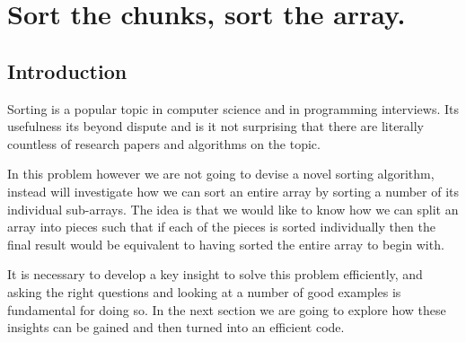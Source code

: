 %



\chapter{Sort the chunks, sort the array.}
\label{ch:max_num_chunks_sorted}
\section*{Introduction}

Sorting is a popular topic in computer science and in programming interviews. 
Its usefulness its beyond dispute and is it not surprising that there are literally
countless of research papers and algorithms on the topic. 

In this problem however we are not going to devise a novel sorting algorithm, instead 
will investigate how we can sort an entire array by sorting a number of its individual sub-arrays.
The idea is that we would like to know how we can split an array into pieces such that if each of the pieces is sorted 
individually then the final result would be equivalent to having sorted the entire array to begin with.

It is necessary to develop a key insight to solve this problem efficiently, 
and asking the right questions and looking at a number of good examples
is fundamental for doing so. In the next section we are going to explore how these insights 
can be gained and then turned into an efficient code. 

